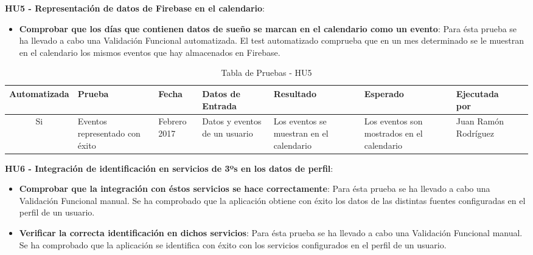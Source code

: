 \documentclass[11pt,openany]{book}
\begin{document}
\textbf{HU5 - Representación de datos de Firebase en el calendario}:
 
\begin{itemize}
\item\textbf{Comprobar que los días que contienen datos de sueño se marcan en el calendario como un evento}: Para ésta prueba se ha llevado a cabo una Validación Funcional automatizada. El test automatizado comprueba que en un mes determinado se le muestran en el calendario los mismos eventos que hay almacenados en Firebase.
\end{itemize}

{\tiny
\setlength{\LTleft}{-20cm plus -1fill}
\setlength{\LTright}{\LTleft}
\begin{center}
\begin{longtable}{| c | M{1.5cm} | M{1.5cm} | M{2.5cm} | M{1.5cm} | M{1.5cm} | M{1.5cm} | M{1.5cm} |}
\caption[Tabla de Pruebas - HU5]{Tabla de Pruebas - HU5} \label{grid_mlmmh} \\

\hline Automatizada & Prueba & Fecha & Datos de Entrada & Resultado & Esperado & Ejecutada por \\
\endfirsthead
\hline
Si & Eventos representado con éxito & Febrero 2017 & Datos y eventos de un usuario & Los eventos se muestran en el calendario & Los eventos son mostrados en el calendario & Juan Ramón Rodríguez \\
\hline
\end{longtable}
\end{center}}
 
\textbf{HU6 - Integración de identificación en servicios de 3ºs en los datos de perfil}:
 
\begin{itemize}
\item\textbf{Comprobar que la integración con éstos servicios se hace correctamente}: Para ésta prueba se ha llevado a cabo una Validación Funcional manual. Se ha comprobado que la aplicación obtiene con éxito los datos de las distintas fuentes configuradas en el perfil de un usuario.
\item\textbf{Verificar la correcta identificación en dichos servicios}: Para ésta prueba se ha llevado a cabo una Validación Funcional manual. Se ha comprobado que la aplicación se identifica con éxito con los servicios configurados en el perfil de un usuario.
\end{itemize}
\end{document}
